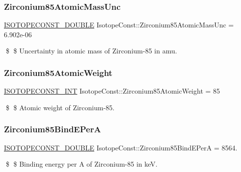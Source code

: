\subsubsection{\texorpdfstring{Zirconium85\+Atomic\+Mass\+Unc}{Zirconium85AtomicMassUnc}}
{\footnotesize\ttfamily \mbox{\hyperlink{group___isotope_const-_macros_ga8f45a7272ce02c0b4c65c44636ed719a}{I\+S\+O\+T\+O\+P\+E\+C\+O\+N\+S\+T\+\_\+\+D\+O\+U\+B\+LE}} Isotope\+Const\+::\+Zirconium85\+Atomic\+Mass\+Unc = 6.\+902e-\/06}

\$ \$ Uncertainty in atomic mass of Zirconium-\/85 in amu. \mbox{\label{group___isotope_const-_zirconium-_zr85_ga74fa454ab1ab4cb33fc7972ab07d1614}} 
\subsubsection{\texorpdfstring{Zirconium85\+Atomic\+Weight}{Zirconium85AtomicWeight}}
{\footnotesize\ttfamily \mbox{\hyperlink{group___isotope_const-_macros_ga5f18360b3e99483a35c32d789e62621c}{I\+S\+O\+T\+O\+P\+E\+C\+O\+N\+S\+T\+\_\+\+I\+NT}} Isotope\+Const\+::\+Zirconium85\+Atomic\+Weight = 85}

\$ \$ Atomic weight of Zirconium-\/85. \mbox{\label{group___isotope_const-_zirconium-_zr85_ga1ef9813d2b8a2487a224eb1ef09a4963}} 
\subsubsection{\texorpdfstring{Zirconium85\+Bind\+E\+PerA}{Zirconium85BindEPerA}}
{\footnotesize\ttfamily \mbox{\hyperlink{group___isotope_const-_macros_ga8f45a7272ce02c0b4c65c44636ed719a}{I\+S\+O\+T\+O\+P\+E\+C\+O\+N\+S\+T\+\_\+\+D\+O\+U\+B\+LE}} Isotope\+Const\+::\+Zirconium85\+Bind\+E\+PerA = 8564.}

\$ \$ Binding energy per A of Zirconium-\/85 in keV. \mbox{\label{group___isotope_const-_zirconium-_zr85_gab3f0654cc89cc01fb6b79367bf48fc4e}} 
